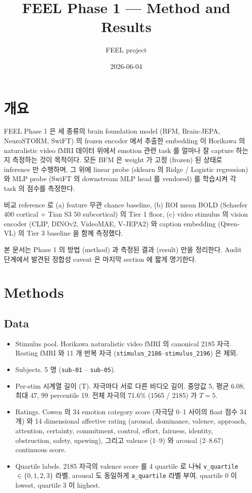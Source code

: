 \documentclass[a4paper,11pt]{article}
\title{FEEL Phase 1 — Method and Results}
\author{FEEL project}
\date{2026-06-04}
\begin{document}
\maketitle

\section{개요}

FEEL Phase 1 은 세 종류의 brain foundation model (BFM, Brain-JEPA, NeuroSTORM, SwiFT)
의 frozen encoder 에서 추출한 embedding 이 Horikawa 의 naturalistic video fMRI 데이터
위에서 emotion 관련 task 를 얼마나 잘 capture 하는지 측정하는 것이 목적이다.
모든 BFM 은 weight 가 고정 (frozen) 된 상태로 inference 만 수행하며, 그 위에
linear probe (sklearn 의 Ridge / Logistic regression) 와 MLP probe (SwiFT 의 downstream MLP head 를 vendored)
를 학습시켜 각 task 의 점수를 측정한다.

비교 reference 로 (a) feature 무관 chance baseline, (b) ROI mean BOLD (Schaefer 400 cortical + Tian S3 50 subcortical) 의
Tier 1 floor, (c) video stimulus 의 vision encoder (CLIP, DINOv2, VideoMAE, V-JEPA2)
와 caption embedding (Qwen-VL) 의 Tier 3 baseline 을 함께 측정했다.

본 문서는 Phase 1 의 방법 (method) 과 측정된 결과 (result) 만을 정리한다.
Audit 단계에서 발견된 정합성 caveat 은 마지막 section 에 짧게 명기한다.

\section{Methods}

\subsection{Data}

\begin{itemize}[leftmargin=*, itemsep=2pt]
  \item Stimulus pool. Horikawa naturalistic video fMRI 의 canonical 2185 자극.
    Resting fMRI 와 11 개 반복 자극 (\texttt{stimulus\_2186}--\texttt{stimulus\_2196}) 은 제외.
  \item Subjects. 5 명 (\texttt{sub-01} -- \texttt{sub-05}).
  \item Per-stim 시계열 길이 (T). 자극마다 서로 다른 비디오 길이. 중앙값 5, 평균 6.08, 최대 47, 99 percentile 19.
    전체 자극의 71.6\% (1565 / 2185) 가 $T=5$.
  \item Ratings. Cowen 의 34 emotion category score (자극당 0--1 사이의 float 점수 34 개) 와
    14 dimensional affective rating (arousal, dominance, valence, approach, attention,
    certainty, commitment, control, effort, fairness, identity, obstruction, safety, upswing),
    그리고 valence (1--9) 와 arousal (2--8.67) continuous score.
  \item Quartile labels. 2185 자극의 valence score 를 4 quartile 로 나눠 \texttt{v\_quartile}$\in\{0,1,2,3\}$ 라벨,
    arousal 도 동일하게 \texttt{a\_quartile} 라벨 부여. quartile 0 이 lowest, quartile 3 이 highest.
\end{itemize}
\end{document}
